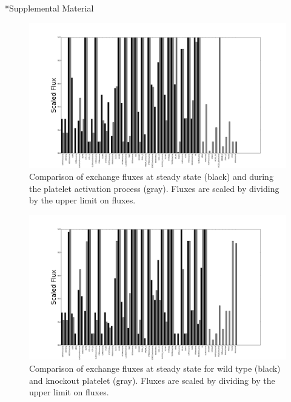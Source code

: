 \documentclass[11pt]{article}
\makeatletter
\renewcommand\section{\@startsection
	{subsection}{2}{0mm}
	{-0.2in}
	{0.05\baselineskip}
	{\normalfont\large\bfseries}}
\renewcommand{\figurename}{Fig.}
\makeatother
\begin{document}
\section*{Supplemental Material}
\setcounter{figure}{0}    %
\renewcommand{\figurename}{S}
\begin{landscape}
\begin{figure}
\hspace{-2cm}
\includegraphics[scale=.55]{../figures/Ca_barTransport_Extracellular}
\caption{Comparison of exchange fluxes at steady state (black) and during the platelet activation process (gray). Fluxes are scaled by dividing by the upper limit on fluxes.}
\label{fig:Ca_Exchange}
\end{figure}

\begin{figure}
\hspace{-2cm}
\includegraphics[scale=.55]{../figures/barSSKnockouts[5742,5743]Transport_Extracellular}
\caption{Comparison of exchange fluxes at steady state for wild type (black) and knockout platelet (gray). Fluxes are scaled by dividing by the upper limit on fluxes.}
\label{fig:knockoutExchangeSS}
\end{figure}
\end{landscape}
\end{document}
